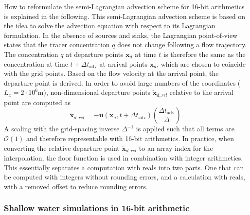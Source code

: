 \documentclass[draft]{agujournal2019}
\newcommand{\op}{\operatorname}
\begin{document}
How to reformulate the semi-Lagrangian advection scheme for 16-bit arithmetics is explained in the following. This semi-Lagrangian advection scheme is based on the idea to solve the advection equation with respect to its Lagrangian formulation. In the absence of sources and sinks, the Lagrangian point-of-view states that the tracer concentration $q$ does not change following a flow trajectory. The concentration $q$ at departure points $\mathbf{x}_d$ at time $t$ is therefore the same as the concentration at time $t+\Delta t_{\op{adv}}$ at arrival points $\mathbf{x}_a$, which are chosen to coincide with the grid points. Based on the flow velocity at the arrival point, the departure point is derived. In order to avoid large numbers of the coordinates ($L_x = 2 \cdot 10^6$m), non-dimensional departure points $\mathbf{\tilde{x}}_{d,rel}$ relative to the arrival point are computed as
\begin{equation}
\mathbf{\tilde{x}}_{d,rel} = - \mathbf{u}(\mathbf{x}_a,t+\Delta t_{\op{adv}}) \left( \frac{\Delta t_{\op{adv}}}{\Delta} \right).
\label{eq:relcoord}
\end{equation}
A scaling with the grid-spacing inverse $\Delta^{-1}$ is applied such that all terms are $\mathcal{O}(1)$ and therefore representable with 16-bit arithmetics. In practice, when converting the relative departure point $\mathbf{\tilde{x}}_{d,rel}$ to an array index for the interpolation, the floor function is used in combination with integer arithmetics. This essentially separates a computation with reals into two parts. One that can be computed with integers without rounding errors, and a calculation with reals, with a removed offset to reduce rounding errors.

\subsubsection{Shallow water simulations in 16-bit arithmetic}
\end{document}
